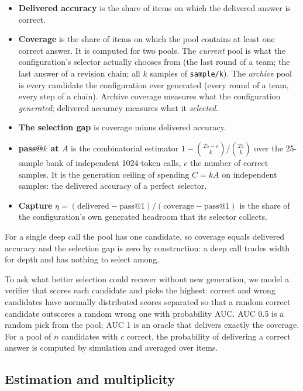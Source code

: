 \documentclass[11pt]{article}
\begin{document}
\begin{itemize}
\item \textbf{Delivered accuracy} is the share of items on which the delivered answer is correct.
\item \textbf{Coverage} is the share of items on which the pool contains at least one correct answer. It
is computed for two pools. The \emph{current} pool is what the configuration's selector actually chooses
from (the last round of a team; the last answer of a revision chain; all $k$ samples of \texttt{sample/k}).
The \emph{archive} pool is every candidate the configuration ever generated (every round of a team, every
step of a chain). Archive coverage measures what the configuration \emph{generated}; delivered accuracy
measures what it \emph{selected}.
\item \textbf{The selection gap} is coverage minus delivered accuracy.
\item \textbf{pass@$k$ at $A$} is the combinatorial estimator $1-\binom{25-c}{k}/\binom{25}{k}$ over the
25-sample bank of independent 1024-token calls, $c$ the number of correct samples. It is the generation
ceiling of spending $C = kA$ on independent samples: the delivered accuracy of a perfect selector.
\item \textbf{Capture} $\eta = (\text{delivered} - \text{pass@1}) / (\text{coverage} - \text{pass@1})$ is
the share of the configuration's own generated headroom that its selector collects.
\end{itemize}

For a single deep call the pool has one candidate, so coverage equals delivered accuracy and the selection
gap is zero by construction: a deep call trades width for depth and has nothing to select among.

To ask what better selection could recover without new generation, we model a verifier that scores each
candidate and picks the highest: correct and wrong candidates have normally distributed scores separated so
that a random correct candidate outscores a random wrong one with probability AUC. AUC 0.5 is a random pick
from the pool; AUC 1 is an oracle that delivers exactly the coverage. For a pool of $n$ candidates with $c$
correct, the probability of delivering a correct answer is computed by simulation and averaged over items.

\subsection{Estimation and multiplicity}
\end{document}
